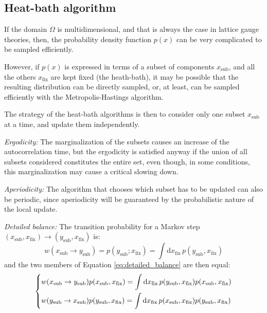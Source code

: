 \subsection*{Heat-bath algorithm}
If the domain $\Omega$ is multidimensional, and that is always the case in lattice gauge theories, then,
the probability density function $p(x)$ can be very complicated to be sampled efficiently.

However, if $p(x)$ is expressed in terms of a subset of components $x_\mathrm{sub}$, and all the others $x_\mathrm{fix}$ are kept fixed (the heath-bath),
it may be possible that the resulting distribution can be directly sampled, or, at least,
can be sampled efficiently with the Metropolis-Hastings algorithm.

The strategy of the heat-bath algorithms is then to consider only one subset $x_\mathrm{sub}$ at a time, and update them independently.

\begin{description}
    \item{\emph{Ergodicity:}} The marginalization of the subsets causes an increase of the autocorrelation time,
        but the ergodicity is satisfied anyway if the union of all subsets considered constitutes the entire set,
        even though, in some conditions, this marginalization may cause a critical slowing down.
    \item{\emph{Aperiodicity:}} The algorithm that chooses which subset has to be updated can also be periodic,
        since aperiodicity will be guaranteed by the probabilistic nature of the local update.
    \item{\emph{Detailed balance:}} The transition probability for a Markov step $(x_\mathrm{sub},x_\mathrm{fix})\to (y_\mathrm{sub},x_\mathrm{fix})$ is:
        \[
            w(x_\mathrm{sub}\to y_\mathrm{sub}) = p(y_\mathrm{sub};x_\mathrm{fix}) = \int\mathrm dx_\mathrm{fix}\,p(y_\mathrm{sub},x_\mathrm{fix})
        \]
        and the two members of Equation \eqref{eq:detailed_balance} are then equal:
        \[
            \begin{dcases}
                w(x_\mathrm{sub}\to y_\mathrm{sub})p(x_\mathrm{sub},x_\mathrm{fix}) = \int\mathrm dx_\mathrm{fix}\,p(y_\mathrm{sub},x_\mathrm{fix})p(x_\mathrm{sub},x_\mathrm{fix}) \\
                w(y_\mathrm{sub}\to x_\mathrm{sub})p(y_\mathrm{sub},x_\mathrm{fix}) = \int\mathrm dx_\mathrm{fix}\,p(x_\mathrm{sub},x_\mathrm{fix})p(y_\mathrm{sub},x_\mathrm{fix})
            \end{dcases}
        \]
\end{description}

